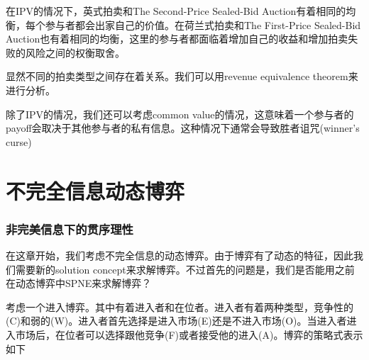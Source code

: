 \documentclass[UTF8,12pt]{ctexart}
\numberwithin{equation}{section} %
\numberwithin{figure}{section}
\numberwithin{table}{section}
\begin{document}
	在IPV的情况下，英式拍卖和The Second-Price Sealed-Bid Auction有着相同的均衡，每个参与者都会出家自己的价值。在荷兰式拍卖和The First-Price Sealed-Bid Auction也有着相同的均衡，这里的参与者都面临着增加自己的收益和增加拍卖失败的风险之间的权衡取舍。
	
	显然不同的拍卖类型之间存在着关系。我们可以用revenue equivalence theorem来进行分析。
	
	除了IPV的情况，我们还可以考虑common value的情况，这意味着一个参与者的payoff会取决于其他参与者的私有信息。这种情况下通常会导致胜者诅咒(winner's curse)
	
	\newpage
	\part{不完全信息动态博弈}
	
	\section{非完美信息下的贯序理性}
	在这章开始，我们考虑不完全信息的动态博弈。由于博弈有了动态的特征，因此我们需要新的solution concept来求解博弈。不过首先的问题是，我们是否能用之前在动态博弈中SPNE来求解博弈？
	
	考虑一个进入博弈。其中有着进入者和在位者。进入者有着两种类型，竞争性的(C)和弱的(W)。进入者首先选择是进入市场(E)还是不进入市场(O)。当进入者进入市场后，在位者可以选择跟他竞争(F)或者接受他的进入(A)。博弈的策略式表示如下
	
\end{document}
